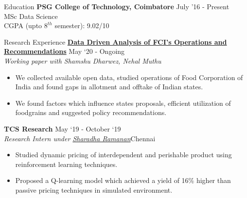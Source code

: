 \documentclass{resume} %
\begin{document}
\begin{rSection}{Education}
\vspace*{0.1in}
{\bf PSG College of Technology, Coimbatore} \hfill {July '16 - Present} \\ {MSc Data Science} \\
CGPA (upto $8^{th}$ semester): 9.02/10
\end{rSection}
\begin{rSection}{Research Experience}
\vspace*{0.1in}
{\bf \href{https://arunpalaniappan.github.io/2020-10/FCI.pdf}{Data Driven Analysis of FCI’s Operations and Recommendations}} { \hfill May `20 - Ongoing}\\
\textit{Working paper with Shamshu Dharwez, Nehal Muthu}
\begin{itemize}
\item We collected available open data, studied operations of Food Corporation of India and found gaps in allotment and offtake of Indian states.
\item We found factors which influence states proposals, efficient utilization of foodgrains and suggested policy recommendations.
\end{itemize}

{\bf TCS Research} { \hfill May `19 - October `19}\\
\textit{Research Intern under \href{https://www.linkedin.com/in/sharadha-ramanan-43bb4946/}{Sharadha Ramanan}}{\hfill Chennai}
\begin{itemize}
\item Studied dynamic pricing of interdependent and perishable product using reinforcement learning techniques.
\item Proposed a Q-learning model which achieved a yield of 16\% higher than passive pricing techniques in simulated environment.
\end{itemize}
\end{rSection}
\end{document}
